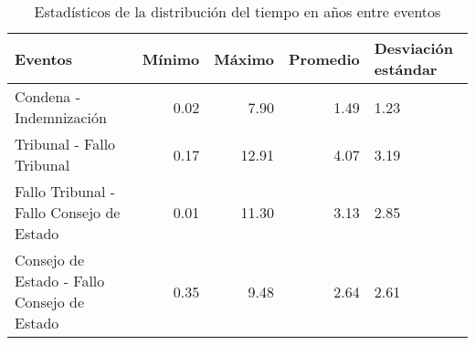 \begin{table}[htbp]
\centering
\caption{Estadísticos de la distribución del
tiempo en años entre eventos} 
\label{tab:eventos-otros}
\begin{tabular}{p{6cm}rrrR{2cm}}
  \hline
Eventos & Mínimo & Máximo & Promedio & Desviación estándar \\ 
  \hline
Condena - Indemnización & 0.02 & 7.90 & 1.49 & 1.23 \\ 
  Tribunal - Fallo Tribunal & 0.17 & 12.91 & 4.07 & 3.19 \\ 
  Fallo Tribunal - Fallo Consejo de Estado & 0.01 & 11.30 & 3.13 & 2.85 \\ 
  Consejo de Estado - Fallo Consejo de Estado & 0.35 & 9.48 & 2.64 & 2.61 \\ 
   \hline
\end{tabular}
\end{table}
